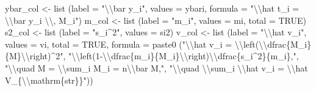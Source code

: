 \documentclass[
  letterpaper,
  DIV=11,
  numbers=noendperiod]{scrreprt}
\newenvironment{Shaded}{\begin{snugshade}}{\end{snugshade}}
\newcommand{\AttributeTok}[1]{\textcolor[rgb]{0.40,0.45,0.13}{#1}}
\newcommand{\ConstantTok}[1]{\textcolor[rgb]{0.56,0.35,0.01}{#1}}
\newcommand{\FunctionTok}[1]{\textcolor[rgb]{0.28,0.35,0.67}{#1}}
\newcommand{\NormalTok}[1]{\textcolor[rgb]{0.00,0.23,0.31}{#1}}
\newcommand{\OtherTok}[1]{\textcolor[rgb]{0.00,0.23,0.31}{#1}}
\newcommand{\SpecialCharTok}[1]{\textcolor[rgb]{0.37,0.37,0.37}{#1}}
\newcommand{\StringTok}[1]{\textcolor[rgb]{0.13,0.47,0.30}{#1}}
\renewcommand{\[}{\begin{equation}}
\renewcommand{\]}{\end{equation}}
\begin{document}
\begin{Shaded}
\begin{Highlighting}[]
\NormalTok{  ybar\_col }\OtherTok{\textless{}{-}} \FunctionTok{list}\NormalTok{ (}\AttributeTok{label =} \StringTok{"}\SpecialCharTok{\textbackslash{}\textbackslash{}}\StringTok{bar y\_i"}\NormalTok{, }\AttributeTok{values =}\NormalTok{ ybari, }\AttributeTok{formula =} \StringTok{"}\SpecialCharTok{\textbackslash{}\textbackslash{}}\StringTok{hat t\_i = }\SpecialCharTok{\textbackslash{}\textbackslash{}}\StringTok{bar y\_i }\SpecialCharTok{\textbackslash{}\textbackslash{}}\StringTok{, M\_i"}\NormalTok{)}
\NormalTok{  m\_col    }\OtherTok{\textless{}{-}} \FunctionTok{list}\NormalTok{ (}\AttributeTok{label =} \StringTok{"m\_i"}\NormalTok{,   }\AttributeTok{values =}\NormalTok{ mi,  }\AttributeTok{total =} \ConstantTok{TRUE}\NormalTok{)}
\NormalTok{  s2\_col   }\OtherTok{\textless{}{-}} \FunctionTok{list}\NormalTok{ (}\AttributeTok{label =} \StringTok{"s\_i\^{}2"}\NormalTok{, }\AttributeTok{values =}\NormalTok{ si2)}
\NormalTok{  v\_col    }\OtherTok{\textless{}{-}} \FunctionTok{list}\NormalTok{ (}\AttributeTok{label =} \StringTok{"}\SpecialCharTok{\textbackslash{}\textbackslash{}}\StringTok{hat v\_i"}\NormalTok{, }\AttributeTok{values =}\NormalTok{ vi, }\AttributeTok{total =} \ConstantTok{TRUE}\NormalTok{,}
                    \AttributeTok{formula =} \FunctionTok{paste0}\NormalTok{ (}\StringTok{"}\SpecialCharTok{\textbackslash{}\textbackslash{}}\StringTok{hat v\_i = }\SpecialCharTok{\textbackslash{}\textbackslash{}}\StringTok{left(}\SpecialCharTok{\textbackslash{}\textbackslash{}}\StringTok{dfrac\{M\_i\}\{M\}}\SpecialCharTok{\textbackslash{}\textbackslash{}}\StringTok{right)\^{}2"}\NormalTok{,}
                                      \StringTok{"}\SpecialCharTok{\textbackslash{}\textbackslash{}}\StringTok{left(1{-}}\SpecialCharTok{\textbackslash{}\textbackslash{}}\StringTok{dfrac\{m\_i\}\{M\_i\}}\SpecialCharTok{\textbackslash{}\textbackslash{}}\StringTok{right)}\SpecialCharTok{\textbackslash{}\textbackslash{}}\StringTok{dfrac\{s\_i\^{}2\}\{m\_i\},"}\NormalTok{,}
                                      \StringTok{"}\SpecialCharTok{\textbackslash{}\textbackslash{}}\StringTok{quad M = }\SpecialCharTok{\textbackslash{}\textbackslash{}}\StringTok{sum\_i M\_i = n}\SpecialCharTok{\textbackslash{}\textbackslash{}}\StringTok{bar M,"}\NormalTok{,}
                                      \StringTok{"}\SpecialCharTok{\textbackslash{}\textbackslash{}}\StringTok{quad }\SpecialCharTok{\textbackslash{}\textbackslash{}}\StringTok{sum\_i }\SpecialCharTok{\textbackslash{}\textbackslash{}}\StringTok{hat v\_i = }\SpecialCharTok{\textbackslash{}\textbackslash{}}\StringTok{hat V\_\{}\SpecialCharTok{\textbackslash{}\textbackslash{}}\StringTok{mathrm\{str\}\}"}\NormalTok{))}


\end{Highlighting}
\end{Shaded}
\end{document}
